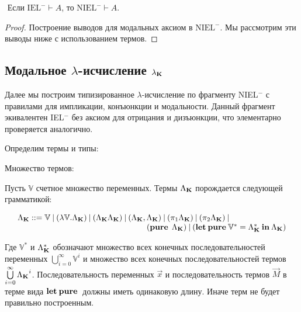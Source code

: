 \begin{lemma}
$ $
Если $\text{IEL}^{-} \vdash A$, то $\text{NIEL}^{-} \vdash A$.
\end{lemma}

\begin{proof}
Построение выводов для модальных аксиом в $\text{NIEL}^{-}$. Мы рассмотрим эти выводы ниже с использованием термов.
\end{proof}

\vspace{\baselineskip}

\subsection{Модальное $\lambda$-исчисление $\lambda_{\bf K}$}

Далее мы построим типизированное $\lambda$-исчисление по фрагменту NIEL$^{-}$ с правилами для импликации, конъюнкции и модальности.
Данный фрагмент экивалентен IEL$^{-}$ без аксиом для отрицания и дизъюнкции, что элементарно проверяется аналогично.

Определим термы и типы:

\vspace{\baselineskip}

\begin{defin} Множество термов:

Пусть $\mathbb{V}$ счетное множество переменных. Термы $\Lambda_{{\bf K}}$ порождается следующей грамматикой:

$\begin{array}{lll}
& \Lambda_{{\bf K}} ::= \mathbb{V} \: | \:  (\lambda \mathbb{V}.\Lambda_{{\bf K}}) \: | \: (\Lambda_{{\bf K}}\Lambda_{{\bf K}}) \: | \: (\Lambda_{{\bf K}} , \Lambda_{{\bf K}}) \: | \: (\pi_1 \Lambda_{{\bf K}}) \: | \: (\pi_2 \Lambda_{{\bf K}}) \: | & \\
& \quad\quad\quad\quad\quad\quad\quad\quad\quad\quad\quad\quad\quad\quad\quad\quad ({\bf pure \: } \: \Lambda_{{\bf K}}) \: | \: ({\bf let \: pure \:} \mathbb{V}^{*} = \Lambda_{{\bf K}}^{*} {\: \bf in \:} \Lambda_{{\bf K}})
\end{array}$

\end{defin}

Где $\mathbb{V}^{*}$ и $\Lambda_{{\bf K}}^{*}$ обозначают множество всех конечных последовательностей переменных $\bigcup \limits_{i=0}^{\infty} \mathbb{V}^i$
и множество всех конечных последовательностей термов $\bigcup \limits_{i = 0}^{\infty} {\Lambda_{{\bf K}}}^i $. Последовательность переменных $\vec{x}$ и последовательность термов $\vec{M}$ в терме вида ${\bf let \: pure \:}$ должны иметь одинаковую длину.
Иначе терм не будет правильно построенным.

